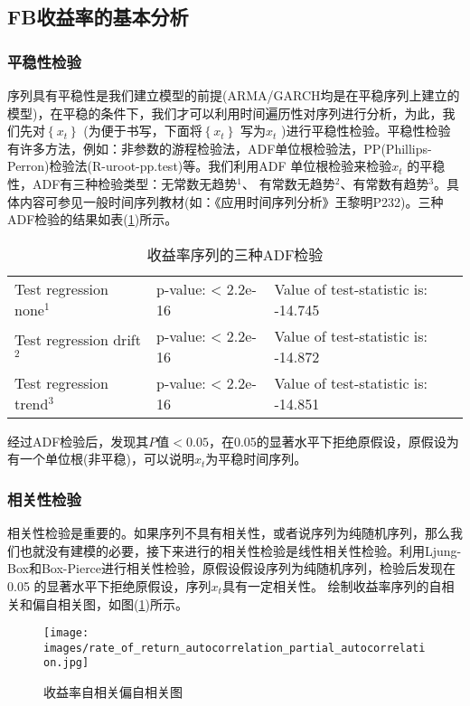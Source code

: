    \subsection{FB收益率的基本分析}
        \subsubsection{平稳性检验}
            \par
            序列具有平稳性是我们建立模型的前提(ARMA/GARCH均是在平稳序列上建立的模型)，在平稳的条件下，我们才可以利用时间遍历性对序列进行分析，为此，我们先对$\left\{x_t\right\}$ (为便于书写，下面将$\left\{x_t\right\}$ 写为$x_t$ )进行平稳性检验。平稳性检验有许多方法，例如：非参数的游程检验法，ADF单位根检验法，PP(Phillips-Perron)检验法(R-uroot-pp.test)等。我们利用ADF 单位根检验来检验$x_t$ 的平稳性，ADF有三种检验类型：无常数无趋势$^1$、
            有常数无趋势$^2$、有常数有趋势$^3$。具体内容可参见一般时间序列教材(如：《应用时间序列分析》王黎明P232)。三种ADF检验的结果如表(\ref{收益率序列的三种ADF检验})所示。
        \begin{table}[H]
        \centering
        \caption{收益率序列的三种ADF检验}
        \label{收益率序列的三种ADF检验}
        \begin{tabular}{lll}
            \toprule
    Test regression none$^1$   & p-value: < 2.2e-16  & Value of test-statistic is: -14.745\\
    Test regression drift$^2$  & p-value: < 2.2e-16  & Value of test-statistic is: -14.872\\
    Test regression trend$^3$  & p-value: < 2.2e-16  & Value of test-statistic is: -14.851\\
        \bottomrule
        \end{tabular}
        \end{table}
            \par
            经过ADF检验后，发现其$P$值$<0.05$，在0.05的显著水平下拒绝原假设，原假设为有一个单位根(非平稳)，可以说明$x_t$为平稳时间序列。
        \subsubsection{相关性检验}
            \par
            相关性检验是重要的。如果序列不具有相关性，或者说序列为纯随机序列，那么我们也就没有建模的必要，接下来进行的相关性检验是线性相关性检验。利用Ljung-Box和Box-Pierce进行相关性检验，原假设假设序列为纯随机序列，检验后发现在0.05 的显著水平下拒绝原假设，序列$x_t$具有一定相关性。
            绘制收益率序列的自相关和偏自相关图，如图(\ref{收益率自相关偏自相关图})所示。
            \begin{figure}[H]
            \centering
            \texttt{[image: images/rate\_of\_return\_autocorrelation\_partial\_autocorrelation.jpg]}
            \caption{收益率自相关偏自相关图}
            \label{收益率自相关偏自相关图}
            \end{figure}

